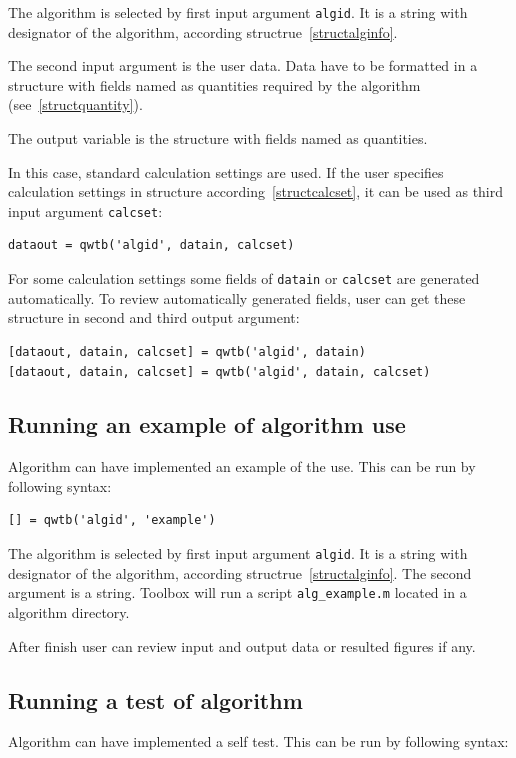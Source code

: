 \documentclass[12pt,a4paper,oneside]{report} %
\begin{document}
The algorithm is selected by first input argument \lstinline{algid}. It is a string with
designator of the algorithm, according structrue~\ref{structalginfo}.

The second input argument is the user data. Data have to be formatted in a structure with fields
named as quantities required by the algorithm (see~\ref{structquantity}).

The output variable is the structure with fields named as quantities.

In this case, standard calculation settings are used. If the user specifies calculation settings
in structure according~\ref{structcalcset}, it can be used as third input argument
\lstinline{calcset}:

\begin{lstlisting}
dataout = qwtb('algid', datain, calcset)
\end{lstlisting}

For some calculation settings some fields of \lstinline{datain} or \lstinline{calcset} are generated
automatically. To review automatically generated fields, user can get these structure in second and
third output argument:

\begin{lstlisting}
[dataout, datain, calcset] = qwtb('algid', datain)
[dataout, datain, calcset] = qwtb('algid', datain, calcset)
\end{lstlisting}

\subsection{Running an example of algorithm use} %
Algorithm can have implemented an example of the use. This can be run by following syntax:

\begin{lstlisting}
[] = qwtb('algid', 'example')
\end{lstlisting}

The algorithm is selected by first input argument \lstinline{algid}. It is a string with
designator of the algorithm, according structrue~\ref{structalginfo}. The second argument is a
string. Toolbox will run a script \lstinline{alg_example.m} located in a algorithm directory.

After finish user can review input and output data or resulted figures if any.

\subsection{Running a test of algorithm} %
Algorithm can have implemented a self test. This can be run by following syntax:
\end{document}
